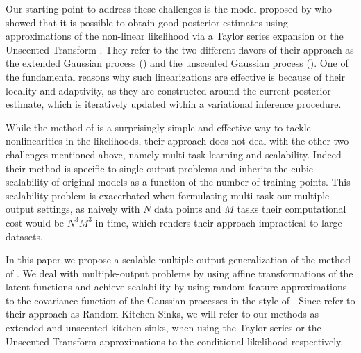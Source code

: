 
Our starting point to address these challenges is the model proposed by 
\citet{steinberg-bonilla-nips-2014} who showed that it is possible to obtain
good posterior estimates using  approximations of the non-linear likelihood 
via a Taylor series expansion or the Unscented Transform \citep{Julier2004}. 
They refer to the two different flavors of their approach as the 
extended Gaussian process (\egp) and the unscented Gaussian process (\ugp).
One of the fundamental reasons why such linearizations are effective is 
because of their locality and adaptivity, as they are 
constructed around the current posterior estimate, 
which is iteratively updated within a variational inference procedure.

While the method of \citet{steinberg-bonilla-nips-2014} is a surprisingly simple and 
effective way to tackle nonlinearities in the likelihoods, their approach  
does not deal with the other two challenges mentioned above, namely multi-task learning 
and scalability. Indeed their method is specific to single-output problems and 
inherits the cubic scalability of original \gp models as a function of the number of 
training points. This scalability problem is exacerbated when formulating  multi-task 
our multiple-output settings, as  naively with $N$ data points and $M$ tasks their
computational cost would be $N^3M^3$ in time, 
which renders their approach impractical to large datasets.  

In this paper we propose a scalable multiple-output generalization  
of the method of \citet{steinberg-bonilla-nips-2014}.
We deal with multiple-output problems  by using 
affine transformations of the latent functions and 
achieve scalability by using random feature approximations 
to the covariance function of the Gaussian processes in the style 
of  \citet{rahimi-recht-nips-2007}. Since 
\citet{rahimi-recht-nips-2007} refer to their approach as 
Random Kitchen Sinks,  we will refer to our methods 
as extended and unscented kitchen sinks, when using 
the Taylor series  or the Unscented Transform approximations 
to the conditional likelihood respectively. 


